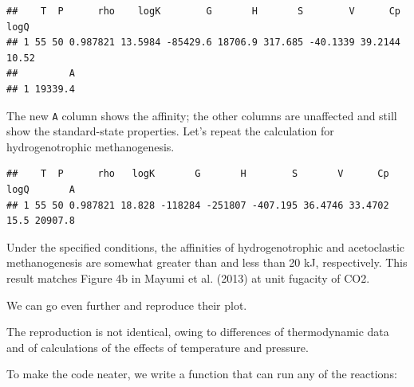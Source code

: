 \documentclass[]{tufte-book}
\newenvironment{Shaded}{}{}
\newcommand{\KeywordTok}[1]{\textcolor[rgb]{0.00,0.44,0.13}{\textbf{#1}}}
\newcommand{\DataTypeTok}[1]{\textcolor[rgb]{0.56,0.13,0.00}{#1}}
\newcommand{\DecValTok}[1]{\textcolor[rgb]{0.25,0.63,0.44}{#1}}
\newcommand{\FloatTok}[1]{\textcolor[rgb]{0.25,0.63,0.44}{#1}}
\newcommand{\StringTok}[1]{\textcolor[rgb]{0.25,0.44,0.63}{#1}}
\newcommand{\ControlFlowTok}[1]{\textcolor[rgb]{0.00,0.44,0.13}{\textbf{#1}}}
\newcommand{\OperatorTok}[1]{\textcolor[rgb]{0.40,0.40,0.40}{#1}}
\newcommand{\NormalTok}[1]{#1}
\begin{document}
\begin{verbatim}
##    T  P      rho    logK        G       H       S        V      Cp  logQ
## 1 55 50 0.987821 13.5984 -85429.6 18706.9 317.685 -40.1339 39.2144 10.52
##         A
## 1 19339.4
\end{verbatim}

The new \texttt{A} column shows the affinity; the other columns are
unaffected and still show the standard-state properties. Let's repeat
the calculation for hydrogenotrophic methanogenesis.

\begin{Shaded}
\end{Shaded}

\begin{verbatim}
##    T  P      rho   logK       G       H        S       V      Cp logQ       A
## 1 55 50 0.987821 18.828 -118284 -251807 -407.195 36.4746 33.4702 15.5 20907.8
\end{verbatim}

Under the specified conditions, the affinities of hydrogenotrophic and
acetoclastic methanogenesis are somewhat greater than and less than 20
kJ, respectively. This result matches Figure 4b in Mayumi et al. (2013)
at unit fugacity of CO2.

We can go even further and reproduce their plot.

\begin{marginfigure}
The reproduction is not identical, owing to differences of thermodynamic
data and of calculations of the effects of temperature and pressure.
\end{marginfigure}

To make the code neater, we write a function that can run any of the
reactions:

\begin{Shaded}
\end{Shaded}
\end{document}
